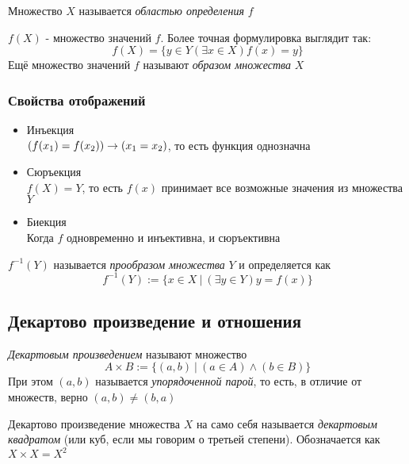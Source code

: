 \begin{definition}
    Множество $X$ называется \textit{областью определения} $f$
\end{definition}

\begin{definition}
    $f(X)$ - множество значений $f$. Более точная формулировка выглядит так:
    $$
    f(X) = \{y \in Y (\exists x \in X) f(x) = y\}
    $$
    Ещё множество значений $f$ называют \textit{образом множества} $X$
\end{definition}


\subsubsection{Свойства отображений}

\begin{itemize}
    \item Инъекция \\
    $(f(x_1) = f(x_2)) \rightarrow (x_1 = x_2)$, то есть функция однозначна
    \item Сюръекция \\
    $f(X) = Y$, то есть $f(x)$ принимает все возможные значения из множества $Y$
    \item Биекция \\
    Когда $f$ одновременно и инъективна, и сюръективна
\end{itemize}

\begin{definition}
    $f^{-1}(Y)$ называется \textit{прообразом множества} $Y$ и определяется как
    $$
        f^{-1}(Y) := \{x \in X\ |\ (\exists y \in Y) y = f(x)\}
    $$
\end{definition}


\subsection{Декартово произведение и отношения}

\begin{definition}
    \textit{Декартовым произведением} называют множество
    $$
        A \times B := \{(a, b)\ |\ (a \in A) \wedge (b \in B)\}
    $$
    При этом $(a, b)$ называется \textit{упорядоченной парой}, то есть, в отличие от множеств, верно $(a, b) \neq (b, a)$
\end{definition}

\begin{definition}
    Декартово произведение множества $X$ на само себя называется \textit{декартовым квадратом} (или куб, если мы говорим о третьей степени). Обозначается как $X \times X = X^2$
\end{definition}


